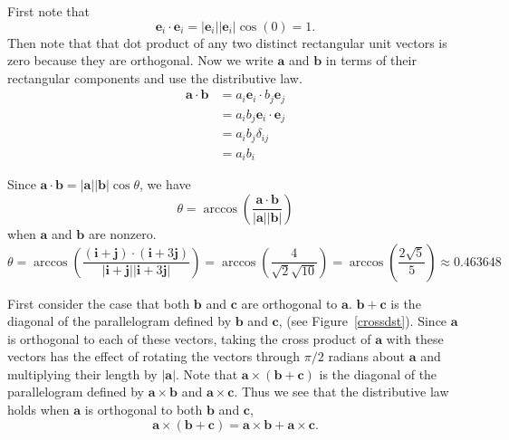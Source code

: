{%
\begin{Solution}
\label{solution a.b = ai bi}
First note that
\[
\mathbf{e}_i \cdot \mathbf{e}_i = | \mathbf{e}_i || \mathbf{e}_i | \cos(0) = 1.
\]
Then note that that dot product of any two distinct rectangular 
unit vectors is zero because they are orthogonal.
Now we write $\mathbf{a}$ and $\mathbf{b}$ in terms of their rectangular
components and use the distributive law.
\begin{align*}
\mathbf{a} \cdot \mathbf{b}
        &= a_i \mathbf{e}_i \cdot b_j \mathbf{e}_j \\
        &= a_i b_j \mathbf{e}_i \cdot \mathbf{e}_j \\
        &= a_i b_j \delta_{i j} \\
        &= a_i b_i
\end{align*}
\end{Solution}





\begin{Solution}
\label{solution angle between i+j i+3j}
Since $\mathbf{a} \cdot \mathbf{b} = | \mathbf{a} | | \mathbf{b} |
\cos \theta$, we have
\[
\theta = \arccos \left( \frac{\mathbf{a} \cdot \mathbf{b}}
        {| \mathbf{a} | | \mathbf{b} | } \right)
\]
when $\mathbf{a}$ and $\mathbf{b}$ are nonzero.
\[
\theta = \arccos \left( \frac
        { (\mathbf{i} + \mathbf{j} ) \cdot ( \mathbf{i} + 3 \mathbf{j} ) }
        { |\mathbf{i} + \mathbf{j} | | \mathbf{i} + 3 \mathbf{j} | } \right)
= \arccos \left( \frac{4}{\sqrt{2} \sqrt{10}} \right)
= \arccos \left( \frac{2 \sqrt{5}}{5} \right)
\approx 0.463648
\]
\end{Solution}





\begin{Solution}
\label{solution distributive law cross product}
First consider the case that both $\mathbf{b}$ and $\mathbf{c}$ are orthogonal to 
$\mathbf{a}$.  $\mathbf{b} + \mathbf{c}$ is the diagonal of the parallelogram
defined by $\mathbf{b}$ and $\mathbf{c}$, (see Figure~\ref{crossdst}).
Since $\mathbf{a}$ is orthogonal to each of these vectors, taking the cross
product of $\mathbf{a}$ with these vectors has the effect of rotating the
vectors through $\pi/2$ radians about $\mathbf{a}$ and multiplying their 
length by $|\mathbf{a}|$.   Note that $\mathbf{a} \times (\mathbf{b} + \mathbf{c})$
is the diagonal of the parallelogram defined by $\mathbf{a} \times \mathbf{b}$
and $\mathbf{a} \times \mathbf{c}$.  Thus we see that the distributive law holds
when $\mathbf{a}$ is orthogonal to both $\mathbf{b}$ and $\mathbf{c}$,
\[
\mathbf{a} \times ( \mathbf{b} + \mathbf{c} ) 
= \mathbf{a} \times \mathbf{b} + \mathbf{a} \times \mathbf{c}.
\]


\end{Solution}}
